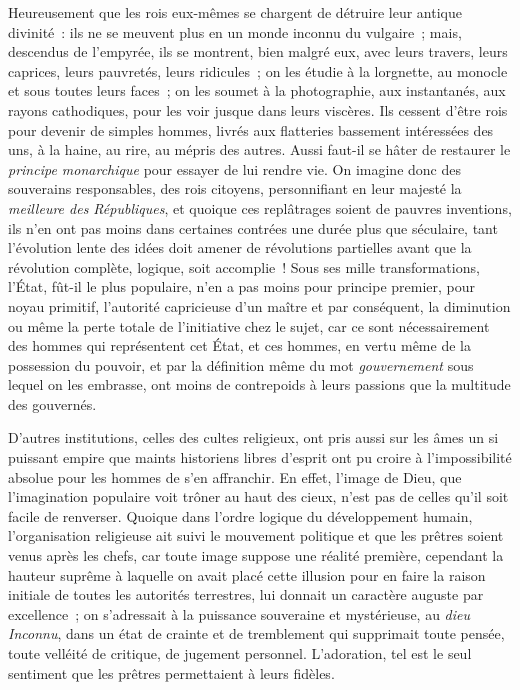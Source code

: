\documentclass[french,twoside]{book} %
\begin{document}
Heureusement que les rois eux-mêmes se chargent de détruire leur antique  divinité : ils ne se meuvent plus en un monde inconnu du vulgaire ; mais, descendus de l’empyrée, ils se montrent, bien malgré eux, avec leurs travers, leurs caprices, leurs pauvretés, leurs ridicules ; on les étudie à la lorgnette, au monocle et sous toutes leurs faces ; on les soumet à la photographie, aux instantanés, aux rayons cathodiques, pour les voir jusque dans leurs viscères. Ils cessent d’être rois pour devenir de simples hommes, livrés aux flatteries bassement intéressées des uns, à la haine, au rire, au mépris des autres. Aussi faut-il se hâter de restaurer le \emph{principe monarchique} pour essayer de lui rendre vie. On imagine donc des souverains responsables, des rois citoyens, personnifiant en leur majesté la \emph{meilleure des Républiques},  et quoique ces replâtrages soient de pauvres inventions, ils n’en ont pas moins dans certaines contrées une durée plus que séculaire, tant l’évolution lente des idées doit amener de révolutions partielles avant que la révolution complète, logique, soit accomplie ! Sous ses mille transformations, l’État, fût-il le plus populaire, n’en a pas moins pour principe premier, pour noyau primitif, l’autorité capricieuse d’un maître et par conséquent, la diminution ou même la perte totale de l’initiative chez le sujet, car ce sont nécessairement des hommes qui représentent cet État, et ces hommes, en vertu même de la possession du pouvoir, et par la définition même du mot \emph{gouvernement} sous lequel on les  embrasse, ont moins de contrepoids à leurs passions que la multitude des gouvernés.\par
D’autres institutions, celles des cultes religieux, ont pris aussi sur les âmes un si puissant empire que maints historiens libres d’esprit ont pu croire à l’impossibilité absolue pour les hommes de s’en affranchir. En effet, l’image de Dieu, que l’imagination populaire voit trôner au haut des cieux, n’est pas de celles qu’il soit facile de renverser. Quoique dans l’ordre logique du développement humain, l’organisation religieuse ait suivi le mouvement politique et que les prêtres soient venus après les chefs, car toute image suppose une réalité première, cependant la hauteur suprême à laquelle on avait placé cette illusion  pour en faire la raison initiale de toutes les autorités terrestres, lui donnait un caractère auguste par excellence ; on s’adressait à la puissance souveraine et mystérieuse, au \emph{dieu Inconnu}, dans un état de crainte et de tremblement qui supprimait toute pensée, toute velléité de critique, de jugement personnel. L’adoration, tel est le seul sentiment que les prêtres permettaient à leurs fidèles.\par
\end{document}
